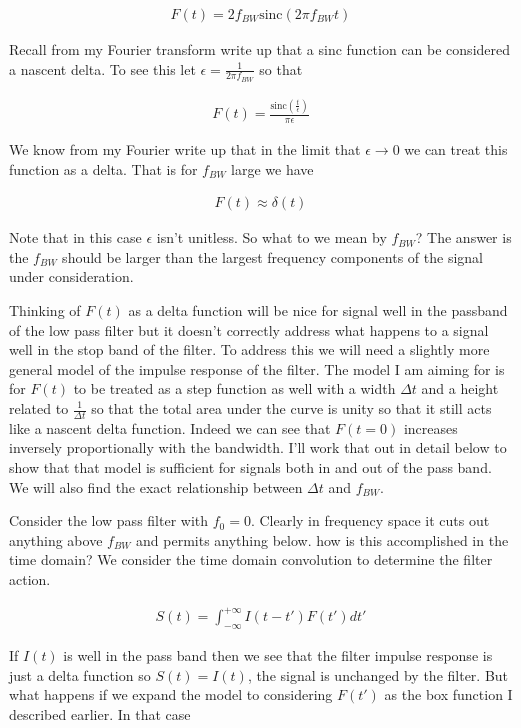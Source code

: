 \documentclass[12pt]{article}
\begin{document}
\begin{align}
F(t) = 2 f_{BW} \text{sinc}(2 \pi f_{BW} t)
\end{align}

 Recall from my Fourier transform write up that a sinc function can be considered a nascent delta. To see this let $\epsilon = \frac{1}{2\pi f_{BW}}$ so that
 
\begin{align}
F(t) = \frac{\text{sinc}\left(\frac{t}{\epsilon}\right)}{\pi \epsilon}
\end{align}

We know from my Fourier write up that in the limit that $\epsilon\rightarrow 0$ we can treat this function as a delta. That is for $f_{BW}$ large we have

\begin{align}
F(t) \approx \delta(t)
\end{align}

Note that in this case $\epsilon$ isn't unitless. So what to we mean by $f_{BW}$? The answer is the $f_{BW}$ should be larger than the largest frequency components of the signal under consideration.

Thinking of $F(t)$ as a delta function will be nice for signal well in the passband of the low pass filter but it doesn't correctly address what happens to a signal well in the stop band of the filter. To address this we will need a slightly more general model of the impulse response of the filter. The model I am aiming for is for $F(t)$ to be treated as a step function as well with a width $\Delta t$ and a height related to $\frac{1}{\Delta t}$ so that the total area under the curve is unity so that it still acts like a nascent delta function. Indeed we can see that $F(t=0)$ increases inversely proportionally with the bandwidth. I'll work that out in detail below to show that that model is sufficient for signals both in and out of the pass band. We will also find the exact relationship between $\Delta t$ and $f_{BW}$.

Consider the low pass filter with $f_0=0$. Clearly in frequency space it cuts out anything above $f_{BW}$ and permits anything below. how is this accomplished in the time domain? We consider the time domain convolution to determine the filter action.

\begin{align}
S(t) = \int_{-\infty}^{+\infty} I(t-t') F(t') dt'
\end{align}

If $I(t)$ is well in the pass band then we see that the filter impulse response is just a delta function so $S(t) = I(t)$, the signal is unchanged by the filter. But what happens if we expand the model to considering $F(t')$ as the box function I described earlier. In that case
\end{document}
